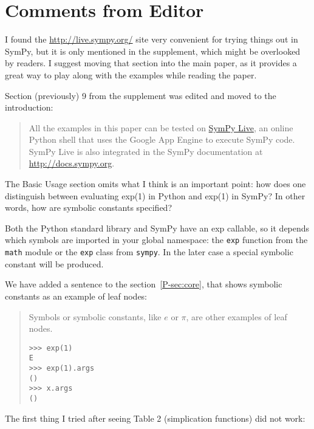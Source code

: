 \documentclass[answers,12pt]{exam}
\begin{document}


\section{Comments from Editor}

\begin{questions}
\question I found the \url{http://live.sympy.org/} site very convenient for trying things
out in SymPy, but it is only mentioned in the supplement, which might be
overlooked by readers. I suggest moving that section into the main paper, as
it provides a great way to play along with the examples while reading the
paper.
\begin{solution}
\label{editorpoint1}
Section (previously) 9 from the supplement was edited and moved to the introduction:
\begin{quote}
  All the examples in this paper can be tested on
  \href{http://live.sympy.org}{SymPy Live}, an online Python shell that uses
  the Google App Engine to execute SymPy code. SymPy Live is also integrated
  in the SymPy documentation at
  \href{http://docs.sympy.org}{http://docs.sympy.org}.
\end{quote}
\end{solution}
\question The Basic Usage section omits what I think is an important point:
how does one distinguish between evaluating exp(1) in Python and exp(1) in
SymPy? In other words, how are symbolic constants specified?
\begin{solution}
  Both the Python standard library and SymPy have an exp callable, so it depends
  which symbols are imported in your global namespace: the \texttt{exp}
  function from the \texttt{math} module or the \texttt{exp} class from \texttt{sympy}.
  In the later case a special symbolic constant will be produced.

We have added a sentence to the section~\ref{P-sec:core}, that shows symbolic
constants as an example of leaf nodes:
\begin{quote}
Symbols or symbolic constants, like $e$ or $\pi$, are other examples of
leaf nodes.
\begin{verbatim}
>>> exp(1)
E
>>> exp(1).args
()
>>> x.args
()
\end{verbatim}
\end{quote}
\end{solution}
\question The first
thing I tried after seeing Table 2 (simplication functions) did not work:


\end{questions}
\end{document}
